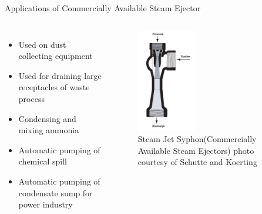 \begin{frame}{Applications of Commercially Available Steam Ejector\cite{SchutteandKoerting}}
  \begin{columns}
    \begin{itemize}
        \item Used on dust collecting equipment
        \item Used for draining large receptacles of waste process
        \item Condensing and mixing ammonia
        \item Automatic pumping of chemical spill
        \item Automatic pumping of condensate sump for power industry
    \end{itemize}
    \begin{figure}
        \centering
        \includegraphics[height=4.5cm]{images/schutteandkoertingthermosyphon.png}
        \caption{\centering Steam Jet Syphon(Commercially Available Steam Ejectors) photo courtesy of Schutte and Koerting \cite{SchutteandKoerting}}
    \end{figure}
  \end{columns}
\end{frame}

